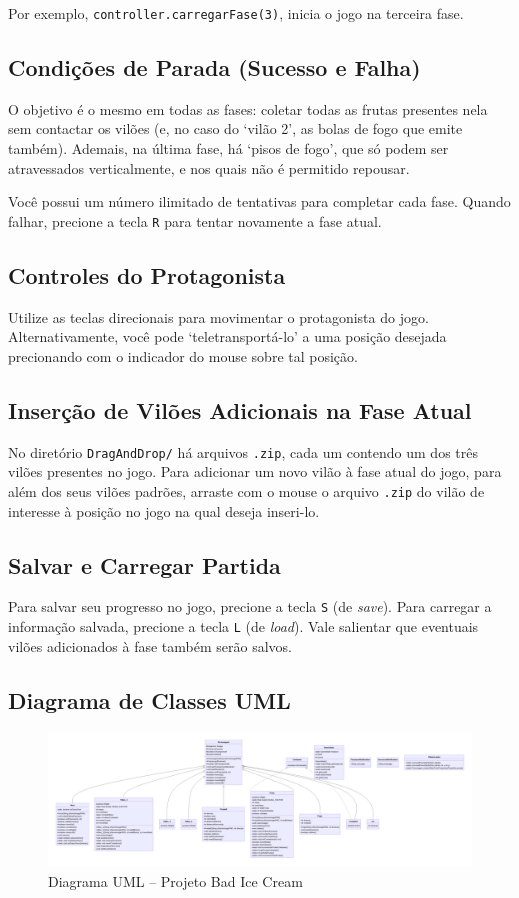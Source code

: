 \documentclass[10pt,a4paper,portuguese]{article}
\begin{document}
        Por exemplo, \verb|controller.carregarFase(3)|, inicia o jogo na terceira fase.

    \subsection{Condições de Parada (Sucesso e Falha)}
        O objetivo é o mesmo em todas as fases: coletar todas as frutas presentes nela sem contactar os vilões (e, no caso do `vilão 2', as bolas de fogo que emite também). Ademais, na última fase, há `pisos de fogo', que só podem ser atravessados verticalmente, e nos quais não é permitido repousar.
        
        Você possui um número ilimitado de tentativas para completar cada fase. Quando falhar, precione a tecla \verb|R| para tentar novamente a fase atual.
        
    \subsection{Controles do Protagonista}
        Utilize as teclas direcionais para movimentar o protagonista do jogo. Alternativamente, você pode `teletransportá-lo' a uma posição desejada precionando com o indicador do mouse sobre tal posição.
        
    \subsection{Inserção de Vilões Adicionais na Fase Atual}
        No diretório \verb|DragAndDrop/| há arquivos \verb|.zip|, cada um contendo um dos três vilões presentes no jogo. Para adicionar um novo vilão à fase atual do jogo, para além dos seus vilões padrões, arraste com o mouse o arquivo \verb|.zip| do vilão de interesse à posição no jogo na qual deseja inseri-lo.
        
    \subsection{Salvar e Carregar Partida}
        Para salvar seu progresso no jogo, precione a tecla \verb|S| (de \emph{save}). Para carregar a informação salvada, precione a tecla \verb|L| (de \emph{load}). Vale salientar que eventuais vilões adicionados à fase também serão salvos.

\begin{landscape}
    \section{Diagrama de Classes UML}
    \begin{figure}[H]
        \centering
        \includegraphics[width=++\linewidth]{class-diagram.png}
        \caption{Diagrama UML -- Projeto Bad Ice Cream}
        \label{fig:class-diagram}
    \end{figure}
\end{landscape}
\end{document}
